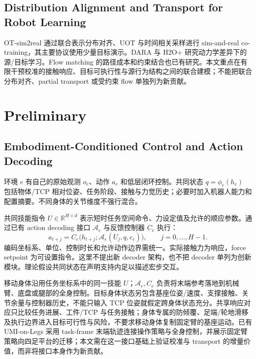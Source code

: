 \documentclass[11pt]{article}
\newcommand{\R}{\mathbb R}
\begin{document}
\subsection{Distribution Alignment and Transport for Robot Learning}
OT-sim2real 通过联合表示分布对齐、UOT 与时间相关采样进行 sim-and-real co-training，其主要协议使用少量目标演示\cite{otreal}。DARA 与 H2O+ 研究动力学差异下的源/目标学习\cite{dara,h2oplus}。Flow matching 的路径成本和约束结合也已有研究\cite{densityflow}。本文重点在有限干预校准的接触响应、目标可执行性与源行为结构之间的联合建模；不能把联合分布对齐、partial transport 或受约束 flow 单独列为新贡献。

\section{Preliminary}
\label{sec:prelim}
\subsection{Embodiment-Conditioned Control and Action Decoding}
环境 $e$ 有自己的原始观测 $o_e$、动作 $a_e$ 和低层闭环控制。共同状态 $q=\phi_e(h_e)$ 包括物体/TCP 相对位姿、任务阶段、接触与力觉历史；必要时加入机器人能力和配置摘要。不同身体的关节维度不强行混合。

共同技能指令 $U\in\R^{H\times d}$ 表示短时任务空间命令、力设定值及允许的顺应参数。通过已有 action decoding 接口 $\mathcal A_e$ 与反馈控制器 $C_e$ 执行：
\begin{equation}
 a_{t+j}=C_e\big(h_{t+j};\mathcal A_e(U_j,q,c_e)\big),
 \qquad j=0,\ldots,H-1.
 \label{eq:decode}
\end{equation}
编码坐标系、单位、控制时长和允许动作边界需统一。实际接触力为响应，force setpoint 为可设置指令。这里不提出新 decoder 架构，也不把 decoder 单列为创新模块。理论假设共同状态在声明支持内足以描述宏步交互。

移动身体沿用任务坐标系中的同一技能 $U$；$\mathcal A_e,C_e$ 负责将末端参考落地到机械臂、底盘或腿部的全身控制。目标身体状态另包含基座位姿/速度、支撑接触、关节余量与控制器历史，不能只输入 TCP 位姿就假定跨身体状态充分。共享响应对应只比较任务进展、工件/TCP 与任务接触；身体专属的防倾覆、足端/轮地滑移及执行边界进入目标可行性与风险，不要求移动身体复制固定臂的基座运动。已有 UMI-on-Legs 采用 task-frame 末端轨迹连接操作策略与全身控制，并展示固定臂策略向四足平台的迁移；本文需在这一接口基础上验证校准与 transport 的增量价值，而非将接口本身作为新贡献\cite{umilegs}。
\end{document}
